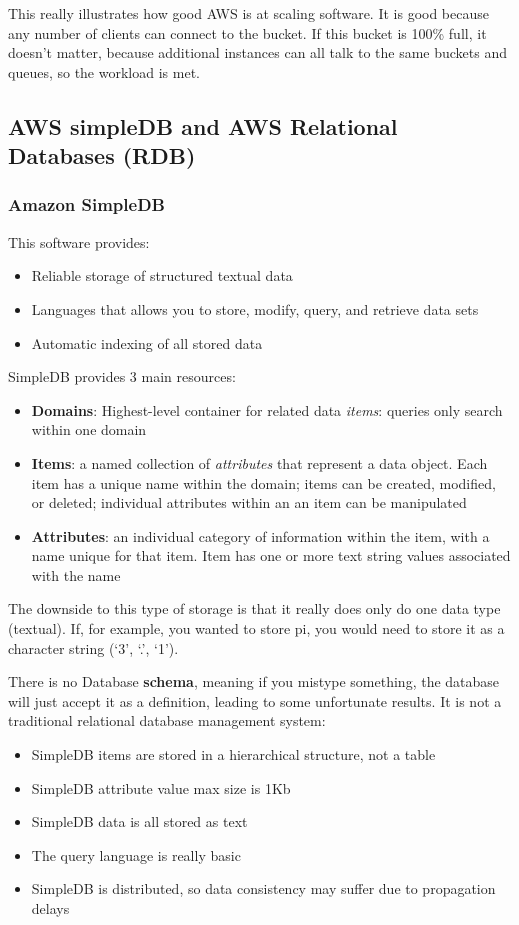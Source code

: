 \documentclass[11pt,a4paper,titlepage,dvipsnames,cmyk]{scrartcl}
\begin{document}
This really illustrates how good AWS is at scaling software. It is good because any number of clients can connect to the bucket. If this bucket is 100\% full, it doesn't matter, because additional instances can all talk to the same buckets and queues, so the workload is met.

\subsection{AWS simpleDB and AWS Relational Databases (RDB)}
\subsubsection{Amazon SimpleDB}
This software provides:
\begin{itemize}
    \item Reliable storage of structured textual data
    \item Languages that allows you to store, modify, query, and retrieve data sets
    \item Automatic indexing of all stored data
\end{itemize}

SimpleDB provides 3 main resources:
\begin{itemize}
    \item \textbf{Domains}: Highest-level container for related data \textit{items}: queries only search within one domain
    \item \textbf{Items}: a named collection of \textit{attributes} that represent a data object. Each item has a unique name within the domain; items can be created, modified, or deleted; individual attributes within an an item can be manipulated
    \item \textbf{Attributes}: an individual category of information within the item, with a name unique for that item. Item has one or more text string values associated with the name
\end{itemize}

The downside to this type of storage is that it really does only do one data type (textual). If, for example, you wanted to store pi, you would need to store it as a character string (`3', `.', `1').

There is no Database \textbf{schema}, meaning if you mistype something, the database will just accept it as a definition, leading to some unfortunate results. It is not a traditional relational database management system:
\begin{itemize}
    \item SimpleDB items are stored in a hierarchical structure, not a table
    \item SimpleDB attribute value max size is 1Kb
    \item SimpleDB data is all stored as text
    \item The query language is really basic
    \item SimpleDB is distributed, so data consistency may suffer due to propagation delays
\end{itemize}
\end{document}
